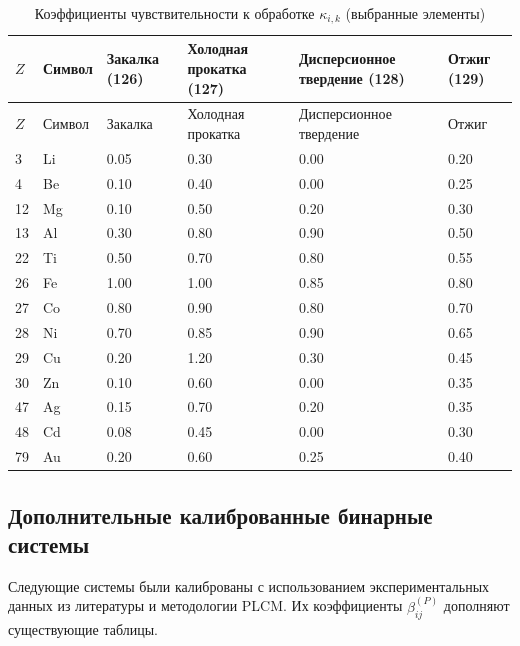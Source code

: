 \documentclass[12pt,a4paper]{article}
\begin{document}
	\begin{longtable}{p{1.8cm} p{1.2cm} p{1.2cm} p{1.2cm} p{1.2cm} p{1.2cm}}
		\caption{Коэффициенты чувствительности к обработке $\kappa_{i,k}$ (выбранные элементы)}\label{tab:kappa_ik}\\
		\toprule
		$Z$ & Символ & Закалка (126) & Холодная прокатка (127) & Дисперсионное твердение (128) & Отжиг (129) \\
		\midrule
		\endfirsthead
		\toprule
		$Z$ & Символ & Закалка & Холодная прокатка & Дисперсионное твердение & Отжиг \\
		\midrule
		\endhead
		3  & Li  & 0.05 & 0.30 & 0.00 & 0.20 \\
		4  & Be  & 0.10 & 0.40 & 0.00 & 0.25 \\
		12 & Mg  & 0.10 & 0.50 & 0.20 & 0.30 \\
		13 & Al  & 0.30 & 0.80 & 0.90 & 0.50 \\
		22 & Ti  & 0.50 & 0.70 & 0.80 & 0.55 \\
		26 & Fe  & 1.00 & 1.00 & 0.85 & 0.80 \\
		27 & Co  & 0.80 & 0.90 & 0.80 & 0.70 \\
		28 & Ni  & 0.70 & 0.85 & 0.90 & 0.65 \\
		29 & Cu  & 0.20 & 1.20 & 0.30 & 0.45 \\
		30 & Zn  & 0.10 & 0.60 & 0.00 & 0.35 \\
		47 & Ag  & 0.15 & 0.70 & 0.20 & 0.35 \\
		48 & Cd  & 0.08 & 0.45 & 0.00 & 0.30 \\
		79 & Au  & 0.20 & 0.60 & 0.25 & 0.40 \\
		\bottomrule
	\end{longtable}
	
	
	\subsection*{Дополнительные калиброванные бинарные системы}
	
	Следующие системы были калиброваны с использованием экспериментальных данных из литературы и методологии PLCM. Их коэффициенты $\beta_{ij}^{(P)}$ дополняют существующие таблицы.
	
\end{document}
